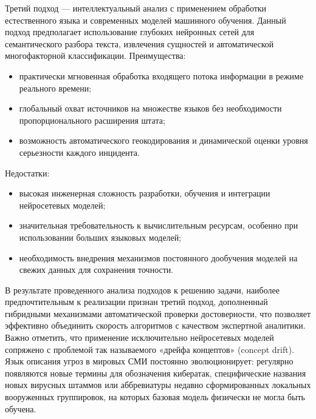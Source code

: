 Третий подход — интеллектуальный анализ с применением обработки естественного языка и современных моделей машинного обучения. Данный подход предполагает использование глубоких нейронных сетей для семантического разбора текста, извлечения сущностей и автоматической многофакторной классификации.
Преимущества:
\begin{itemize}
\item практически мгновенная обработка входящего потока информации в режиме реального времени;
    \item глобальный охват источников на множестве языков без необходимости пропорционального расширения штата;
    \item возможность автоматического геокодирования и динамической оценки уровня серьезности каждого инцидента.
\end{itemize}
Недостатки:
\begin{itemize}
\item высокая инженерная сложность разработки, обучения и интеграции нейросетевых моделей;
    \item значительная требовательность к вычислительным ресурсам, особенно при использовании больших языковых моделей;
    \item необходимость внедрения механизмов постоянного дообучения моделей на свежих данных для сохранения точности.
\end{itemize}

В результате проведенного анализа подходов к решению задачи, наиболее предпочтительным к реализации признан третий подход, дополненный гибридными механизмами автоматической проверки достоверности, что позволяет эффективно объединить скорость алгоритмов с качеством экспертной аналитики. Важно отметить, что применение исключительно нейросетевых моделей сопряжено с проблемой так называемого «дрейфа концептов» (concept drift). Язык описания угроз в мировых СМИ постоянно эволюционирует: регулярно появляются новые термины для обозначения кибератак, специфические названия новых вирусных штаммов или аббревиатуры недавно сформированных локальных вооруженных группировок, на которых базовая модель физически не могла быть обучена.

